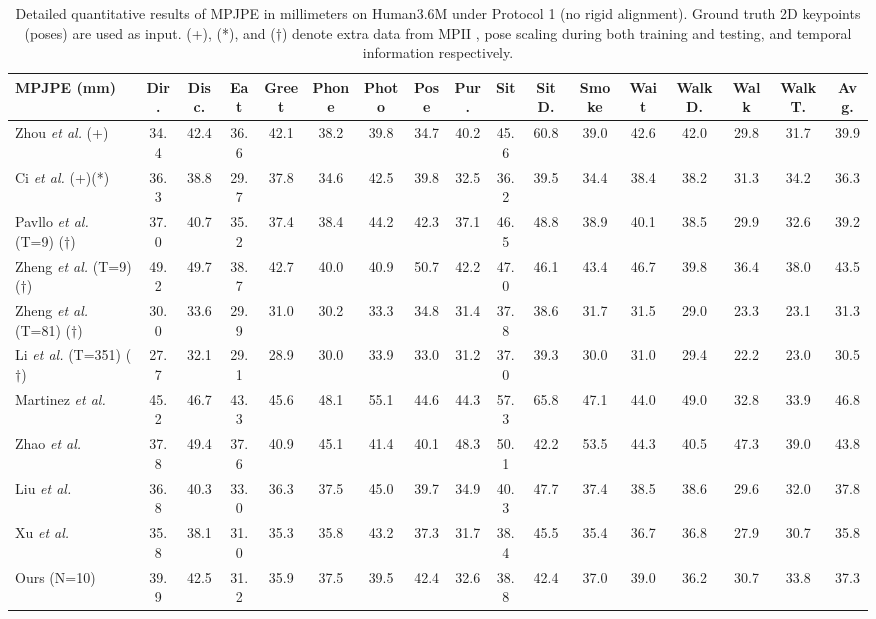 \documentclass[letterpaper, 10 pt, conference]{ieeeconf}
\begin{document}
\begin{table*}[t]
    \centering
    \resizebox{\textwidth}{!}
    {
    \begin{tabular}{l|ccccccccccccccc|c}
        \toprule
        MPJPE (mm) & Dir. & Disc. & Eat & Greet & Phone & Photo & Pose & Pur. & Sit & SitD. & Smoke & Wait & WalkD. & Walk & WalkT. & \textbf{Avg.} \\
        \hline
        Zhou \textit{et al.} \cite{zhou2019hemlets} (+)& 34.4 & 42.4 & 36.6 & 42.1 & 38.2 & 39.8 & 34.7 & 40.2 & 45.6 & 60.8 & 39.0 & 42.6 & 42.0 & 29.8 & 31.7 & 39.9 \\ 
        Ci \textit{et al.} \cite{ci2019optimizing} (+)(*)& 36.3 & 38.8 & 29.7 & 37.8 & 34.6 & 42.5 & 39.8 & 32.5 & 36.2 & 39.5 & 34.4 & 38.4 & 38.2 & 31.3 & 34.2 & 36.3 \\
        \hline
        Pavllo \textit{et al.} \cite{pavllo20193d} (T=9) ($\dagger$)  & 37.0 & 40.7 & 35.2 & 37.4 & 38.4 & 44.2 & 42.3 & 37.1 & 46.5 & 48.8 & 38.9 & 40.1 & 38.5 & 29.9 & 32.6 &39.2\\ 
        Zheng \textit{et al.} \cite{zheng20213d} (T=9) ($\dagger$)& 49.2 & 49.7 & 38.7 & 42.7 & 40.0 & 40.9 & 50.7 & 42.2 & 47.0 & 46.1 & 43.4 & 46.7 & 39.8 & 36.4 & 38.0 & 43.5 \\
        Zheng \textit{et al.} \cite{zheng20213d} (T=81) ($\dagger$) & 30.0 & 33.6 & 29.9&  31.0& 30.2& 33.3 &34.8& 31.4& 37.8 &38.6& 31.7 &31.5 &29.0 &23.3& 23.1& 31.3\\
        Li \textit{et al.} \cite{li2022mhformer} (T=351) ($\dagger$) &27.7 &32.1& 29.1& 28.9 &30.0& 33.9 &33.0 &31.2& 37.0& 39.3 &30.0 &31.0& 29.4& 22.2 &23.0& 30.5\\

       \midrule
           Martinez \textit{et al.} \cite{martinez2017simple}& 45.2&46.7&43.3&45.6&48.1 & 55.1 & 44.6 & 44.3 & 57.3 & 65.8 & 47.1 & 44.0 & 49.0 &  32.8& 33.9&46.8 \\ 
           Zhao \textit{et al.} \cite{zhao2019semantic}& 37.8&49.4&37.6&40.9&45.1 & 41.4 & 40.1 & 48.3 & 50.1 & 42.2 & 53.5 & 44.3 & 40.5 &  47.3& 39.0&43.8 \\ 
               Liu \textit{et al.} \cite{liu2020comprehensive}& 36.8&40.3&33.0&36.3&37.5 & 45.0 & 39.7 & 34.9 & 40.3 & 47.7 & 37.4 & 38.5 & 38.6 & 29.6& 32.0&37.8 \\ 
                   Xu \textit{et al.} \cite{xu2021graph}& 35.8&38.1&31.0&35.3&35.8 & 43.2 & 37.3 & 31.7 & 38.4 & 45.5 & 35.4 & 36.7 & 36.8 & 27.9& 30.7&35.8 \\ 
        \midrule
        Ours (N=10) & 39.9 & 42.5 & 31.2 & 35.9 & 37.5 & 39.5 & 42.4 & 32.6 & 38.8 & 42.4 & 37.0  &39.0 & 36.2& 30.7 &33.8 & 37.3 \\
        \bottomrule
    \end{tabular}
    }
    \caption{Detailed quantitative results of MPJPE in millimeters on Human3.6M under Protocol 1 (no rigid alignment). Ground truth 2D keypoints (poses) are used as input. (+), (*), and ($\dagger$)  denote extra data from MPII \cite{agarwal2005recovering}, pose scaling during both training and testing, and temporal information respectively.}
    \label{tab:gt}
    \vspace{-10pt}
\end{table*} 
\end{document}
